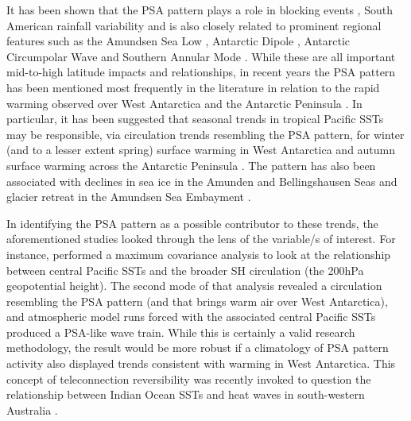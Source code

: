 It has been shown that the PSA pattern plays a role in blocking events \citep{Sinclair1997,Renwick1999}, South American rainfall variability \citep{Mo2001} and is also closely related to prominent regional features such as the Amundsen Sea Low \citep{Turner2013}, Antarctic Dipole \citep{Yuan2001}, Antarctic Circumpolar Wave \citep{Christoph1998} and Southern Annular Mode \citep[SAM; e.g.][]{Ding2012}. While these are all important mid-to-high latitude impacts and relationships, in recent years the PSA pattern has been mentioned most frequently in the literature in relation to the rapid warming observed over West Antarctica and the Antarctic Peninsula \citep{Nicolas2014}. In particular, it has been suggested that seasonal trends in tropical Pacific SSTs may be responsible, via circulation trends resembling the PSA pattern, for winter (and to a lesser extent spring) surface warming in West Antarctica \citep{Ding2011} and autumn surface warming across the Antarctic Peninsula \citep{Ding2013}. The pattern has also been associated with declines in sea ice in the Amunden and Bellingshausen Seas \citep{Schneider2012} and glacier retreat in the Amundsen Sea Embayment \citep{Steig2012}.

In identifying the PSA pattern as a possible contributor to these trends, the aforementioned studies looked through the lens of the variable/s of interest. For instance, \citet{Ding2011} performed a maximum covariance analysis to look at the relationship between central Pacific SSTs and the broader SH circulation (the 200hPa geopotential height). The second mode of that analysis revealed a circulation resembling the PSA pattern (and that brings warm air over West Antarctica), and atmospheric model runs forced with the associated central Pacific SSTs produced a PSA-like wave train. While this is certainly a valid research methodology, the result would be more robust if a climatology of PSA pattern activity also displayed trends consistent with warming in West Antarctica. This concept of teleconnection reversibility was recently invoked to question the relationship between Indian Ocean SSTs and heat waves in south-western Australia \citep{Boschat2016}.   

